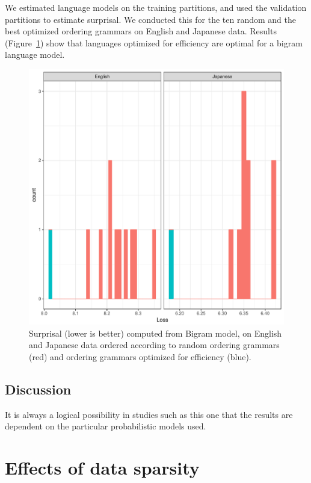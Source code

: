 \documentclass[12pt]{article}
\begin{document}
We estimated language models on the training partitions, and used the validation partitions to estimate surprisal.
We conducted this for the ten random and the best optimized ordering grammars on English and Japanese data.
Results (Figure~\ref{fig:bigrams}) show that languages optimized for efficiency are optimal for a bigram language model.

\begin{figure}
    \centering
    \includegraphics[scale=.4]{../results/bigrams/bigrams.pdf} 
	\caption{Surprisal (lower is better) computed from Bigram model, on English and Japanese data ordered according to random ordering grammars (red) and ordering grammars optimized for efficiency (blue).}
    \label{fig:bigrams}
\end{figure}




\subsection{Discussion}

It is always a logical possibility in studies such as this one that the results are dependent on the particular probabilistic models used. 

\section{Effects of data sparsity}
\end{document}

